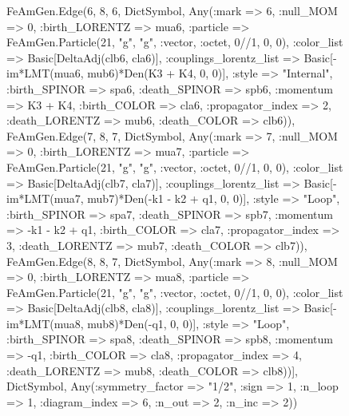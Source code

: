 \documentclass{revtex4}
\begin{document}
\begin{figure}[!htb]
\begin{center}
{FeAmGen.Edge(6, 8, 6, Dict{Symbol, Any}(:mark => 6, :null_MOM => 0, :birth_LORENTZ => mua6, :particle => FeAmGen.Particle(21, "g", "g", :vector, :octet, 0//1, 0, 0), :color_list => Basic[DeltaAdj(clb6, cla6)], :couplings_lorentz_list => Basic[-im*LMT(mua6, mub6)*Den(K3 + K4, 0, 0)], :style => "Internal", :birth_SPINOR => spa6, :death_SPINOR => spb6, :momentum => K3 + K4, :birth_COLOR => cla6, :propagator_index => 2, :death_LORENTZ => mub6, :death_COLOR => clb6)), FeAmGen.Edge(7, 8, 7, Dict{Symbol, Any}(:mark => 7, :null_MOM => 0, :birth_LORENTZ => mua7, :particle => FeAmGen.Particle(21, "g", "g", :vector, :octet, 0//1, 0, 0), :color_list => Basic[DeltaAdj(clb7, cla7)], :couplings_lorentz_list => Basic[-im*LMT(mua7, mub7)*Den(-k1 - k2 + q1, 0, 0)], :style => "Loop", :birth_SPINOR => spa7, :death_SPINOR => spb7, :momentum => -k1 - k2 + q1, :birth_COLOR => cla7, :propagator_index => 3, :death_LORENTZ => mub7, :death_COLOR => clb7)), FeAmGen.Edge(8, 8, 7, Dict{Symbol, Any}(:mark => 8, :null_MOM => 0, :birth_LORENTZ => mua8, :particle => FeAmGen.Particle(21, "g", "g", :vector, :octet, 0//1, 0, 0), :color_list => Basic[DeltaAdj(clb8, cla8)], :couplings_lorentz_list => Basic[-im*LMT(mua8, mub8)*Den(-q1, 0, 0)], :style => "Loop", :birth_SPINOR => spa8, :death_SPINOR => spb8, :momentum => -q1, :birth_COLOR => cla8, :propagator_index => 4, :death_LORENTZ => mub8, :death_COLOR => clb8))], Dict{Symbol, Any}(:symmetry_factor => "1/2", :sign => 1, :n_loop => 1, :diagram_index => 6, :n_out => 2, :n_inc => 2)) 
}
\end{center}
\end{figure}
\end{document}
